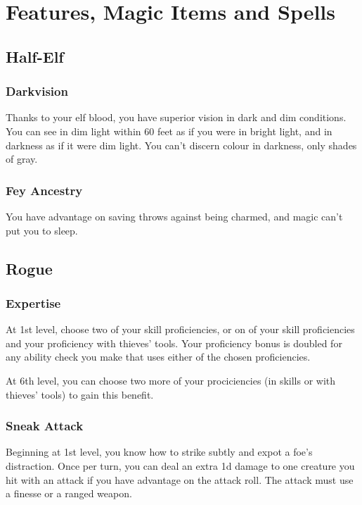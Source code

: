 \documentclass[a4paper,openany,twocolumn]{dndbook}
\begin{document}
\onecolumn



% 


\restoregeometry
\twocolumn

\chapter*{Features, Magic Items and Spells}

\section*{Half-Elf}
\subsection*{Darkvision}
Thanks to your elf blood, you have superior vision in dark and dim conditions. You can see in dim light within 60 feet as if you were in bright light, and in darkness as if it were dim light. You can't discern colour in darkness, only shades of gray.

\subsection*{Fey Ancestry}
You have advantage on saving throws against being charmed, and magic can't put you to sleep.

\section*{Rogue}
\subsection*{Expertise}
At 1st level, choose two of your skill proficiencies, or on of your skill proficiencies and your proficiency with thieves' tools. Your proficiency bonus is doubled for any ability check you make that uses either of the chosen proficiencies.

At 6th level, you can choose two more of your prociciencies (in skills or with thieves' tools) to gain this benefit.

\subsection*{Sneak Attack}
Beginning at 1st level, you know how to strike subtly and expot a foe's distraction. Once per turn, you can deal an extra 1d damage to one creature you hit with an attack if you have advantage on the attack roll. The attack must use a finesse or a ranged weapon.
\end{document}
